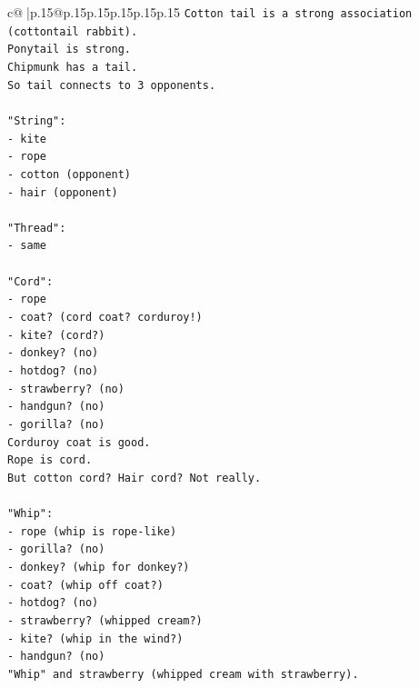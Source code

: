\documentclass{article}
\begin{document}
{\begin{supertabular}{c@{$\;$}|p{.15\linewidth}@{}p{.15\linewidth}p{.15\linewidth}p{.15\linewidth}p{.15\linewidth}p{.15\linewidth}}
{{{\texttt{Cotton tail is a strong association (cottontail rabbit).} \\
\texttt{Ponytail is strong.} \\
\texttt{Chipmunk has a tail.} \\
\texttt{So tail connects to 3 opponents.} \\
\\ 
\texttt{"String":} \\
\texttt{{-} kite} \\
\texttt{{-} rope} \\
\texttt{{-} cotton (opponent)} \\
\texttt{{-} hair (opponent)} \\
\\ 
\texttt{"Thread":} \\
\texttt{{-} same} \\
\\ 
\texttt{"Cord":} \\
\texttt{{-} rope} \\
\texttt{{-} coat? (cord coat? corduroy!)} \\
\texttt{{-} kite? (cord?)} \\
\texttt{{-} donkey? (no)} \\
\texttt{{-} hotdog? (no)} \\
\texttt{{-} strawberry? (no)} \\
\texttt{{-} handgun? (no)} \\
\texttt{{-} gorilla? (no)} \\
\texttt{Corduroy coat is good.} \\
\texttt{Rope is cord.} \\
\texttt{But cotton cord? Hair cord? Not really.} \\
\\ 
\texttt{"Whip":} \\
\texttt{{-} rope (whip is rope{-}like)} \\
\texttt{{-} gorilla? (no)} \\
\texttt{{-} donkey? (whip for donkey?)} \\
\texttt{{-} coat? (whip off coat?)} \\
\texttt{{-} hotdog? (no)} \\
\texttt{{-} strawberry? (whipped cream?)} \\
\texttt{{-} kite? (whip in the wind?)} \\
\texttt{{-} handgun? (no)} \\
\texttt{"Whip" and strawberry (whipped cream with strawberry).} \\
}}}
\end{supertabular}}
\end{document}
